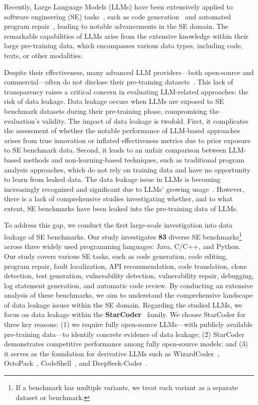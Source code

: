 Recently, Large Language Models (LLMs) have been extensively applied to software engineering (SE) tasks~\cite{10.1145/3695988}, such as code generation~\cite{DBLP:conf/icse/YuSRZZMLLWX24} and automated program repair~\cite{DBLP:conf/icse/XiaWZ23}, leading to notable advancements in the SE domain. The remarkable capabilities of LLMs arise from the extensive knowledge within their large pre-training data, which encompasses various data types, including code, texts, or other modalities.


Despite their effectiveness, many advanced LLM providers—both open-source and commercial—often do not disclose their pre-training datasets~\cite{llama3, gpt-3.5-turbo}. This lack of transparency raises a critical concern in evaluating LLM-related approaches: the risk of data leakage. Data leakage occurs when LLMs are exposed to SE benchmark datasets during their pre-training phase, compromising the evaluation's validity.
The impact of data leakage is twofold. First, it complicates the assessment of whether the notable performance of LLM-based approaches arises from true innovation or inflated effectiveness metrics due to prior exposure to SE benchmark data. Second, it leads to an unfair comparison between LLM-based methods and non-learning-based techniques, such as traditional program analysis approaches, which do not rely on training data and have no opportunity to learn from leaked data.
The data leakage issue in LLMs is becoming increasingly recognized and significant due to LLMs' growing usage~\cite{lópez2024interdatasetcodeduplicationdata}. However, there is a lack of comprehensive studies investigating whether, and to what extent, SE benchmarks have been leaked into the pre-training data of LLMs.



To address this gap, we conduct the first large-scale investigation into data leakage of SE benchmarks. Our study investigates \textbf{83} diverse SE benchmarks\footnote{If a benchmark has multiple variants, we treat each variant as a separate dataset or benchmark.} across three widely used programming languages: Java, C/C++, and Python. Our study covers various SE tasks, such as code generation, code editing, program repair, fault localization, API recommendation, code translation, clone detection, test generation, vulnerability detection, vulnerability repair, debugging, log statement generation, and automatic code review. 
By conducting an extensive analysis of these benchmarks, we aim to understand the comprehensive landscape of data leakage issues within the SE domain. 
Regarding the studied LLMs, we focus on data leakage within the \textbf{StarCoder}~\cite{starcoder_one} family. We choose StarCoder for three key reasons: (1) we require fully open-source LLMs—with publicly available pre-training data—to identify concrete evidence of data leakage; (2) StarCoder demonstrates competitive performance among fully open-source models; and (3) it serves as the foundation for derivative LLMs such as WizardCoder~\cite{luo2023wizardcoder}, OctoPack~\cite{muennighoff2023octopack}, CodeShell~\cite{xie2024codeshell}, and DeepSeek-Coder~\cite{deepseekcoder}.




